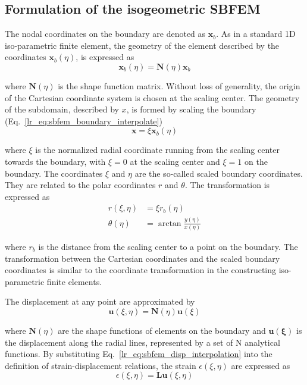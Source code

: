 \subsection{Formulation of the isogeometric SBFEM}
The nodal coordinates on the boundary are denoted as $\mathbf{x}_b$. As in a standard 1D iso-parametric finite element, the geometry of the element described by the coordinates $\mathbf{x}_b(η)$, is expressed as
\begin{equation}
    \mathbf{x}_b(\eta) = \mathbf{N}(\eta) \mathbf{x}_b
    \label{lr_eq:sbfem_boundary_interpolate}
\end{equation}

where $\mathbf{N}(\eta)$ is the shape function matrix.
Without loss of generality, the origin of the Cartesian coordinate system is chosen at the scaling center.
The geometry of the subdomain, described by $x$, is formed by scaling the boundary (Eq.~\ref{lr_eq:sbfem_boundary_interpolate})
\begin{equation}
    \mathbf{x} = \xi \mathbf{x}_b (\eta)
\end{equation}

where $\xi$ is the normalized radial coordinate running from the scaling center towards the boundary, with $\xi=0$ at the scaling center and $\xi=1$ on the boundary.
The coordinates $\xi$ and $\eta$ are the so-called scaled boundary coordinates.
They are related to the polar coordinates $r$ and $\theta$.
The transformation is expressed as
\begin{equation}
\begin{aligned}
    r(\xi,\eta) &= \xi r_b(\eta)     \\
    \theta(\eta) &= \arctan \frac{y(\eta)}{x(\eta)}
    \label{lr_eq:sbfem_transform}
\end{aligned}
\end{equation}

where $r_b$ is the distance from the scaling center to a point on the boundary.
The transformation between the Cartesian coordinates and the scaled boundary coordinates is similar to the coordinate transformation in the constructing iso-parametric finite elements.

The displacement at any point are approximated by
\begin{equation}
    \mathbf{u}(\xi,\eta) = \mathbf{N}(\eta) \mathbf{u}(\xi)
    \label{lr_eq:sbfem_disp_interpolation}
\end{equation}

where $\mathbf{N}(\eta)$ are the shape functions of elements on the boundary and $\mathbf{u(\xi)}$ is the displacement along the radial lines, represented by a set of N analytical functions.
By substituting Eq.~\ref{lr_eq:sbfem_disp_interpolation} into the definition of strain-displacement relations, the strain $\epsilon(\xi,\eta)$ are expressed as
\begin{equation}
    \epsilon(\xi,\eta) = \mathbf{Lu}(\xi,\eta)
    \label{lr_eq:sbfem_strain_disp_relation}
\end{equation}

